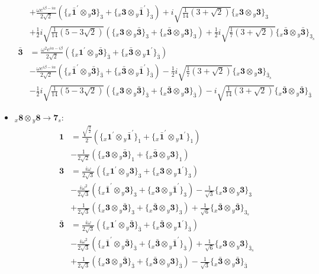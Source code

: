 \documentclass[english]{article}
\newcommand{\rep}[1]{\mathbf{#1}}
\newcommand{\repx}[2]{{}_{#2}\mathbf{#1}}
\newcommand{\tsprodx}[2]{\repx{#1}{x}\otimes\repx{#2}{y}}
\newcommand{\subcgt}[3]{\big\{ \tsprodx{#1}{#2}\big\}^{}_{#3}}
\begin{document}
\begin{itemize}
\begin{align*}
 & +\frac{\omega  e^{i \beta -i \alpha }}{2 \sqrt{2}}\left(\subcgt{\bar{1}^{\prime}}{3}{3}+\subcgt{3}{\bar{1}^{\prime}}{3}\right)+i \sqrt{\frac{1}{14} \left(3+\sqrt{2}\right)}\subcgt{3}{3}{3} \\ 
 & +\frac{1}{2} i \sqrt{\frac{1}{14} \left(5-3 \sqrt{2}\right)}\left(\subcgt{3}{\bar{3}}{3}+\subcgt{\bar{3}}{3}{3}\right)+\frac{1}{2} i \sqrt{\frac{1}{7} \left(3+\sqrt{2}\right)}\subcgt{\bar{3}}{\bar{3}}{3_{s}}
\\
\rep{\bar{3}} & = \frac{\omega ^2 e^{i \alpha -i \beta }}{2 \sqrt{2}}\left(\subcgt{1^{\prime}}{\bar{3}}{\bar{3}}+\subcgt{\bar{3}}{1^{\prime}}{\bar{3}}\right) \\ 
 & -\frac{\omega  e^{i \beta -i \alpha }}{2 \sqrt{2}}\left(\subcgt{\bar{1}^{\prime}}{\bar{3}}{\bar{3}}+\subcgt{\bar{3}}{\bar{1}^{\prime}}{\bar{3}}\right)-\frac{1}{2} i \sqrt{\frac{1}{7} \left(3+\sqrt{2}\right)}\subcgt{3}{3}{\bar{3}_{s}} \\ 
 & -\frac{1}{2} i \sqrt{\frac{1}{14} \left(5-3 \sqrt{2}\right)}\left(\subcgt{3}{\bar{3}}{\bar{3}}+\subcgt{\bar{3}}{3}{\bar{3}}\right)-i \sqrt{\frac{1}{14} \left(3+\sqrt{2}\right)}\subcgt{\bar{3}}{\bar{3}}{\bar{3}}
\end{align*}
\item $\tsprodx{8}{8}\to\rep{7}_{s}$:
\begin{align*}
\rep{1} & = \frac{\sqrt{\frac{3}{2}}}{2}\left(\subcgt{1^{\prime}}{\bar{1}^{\prime}}{1}+\subcgt{\bar{1}^{\prime}}{1^{\prime}}{1}\right) \\ 
 & -\frac{1}{2 \sqrt{2}}\left(\subcgt{3}{\bar{3}}{1}+\subcgt{\bar{3}}{3}{1}\right)
\\
\rep{3} & = \frac{i \omega }{2 \sqrt{3}}\left(\subcgt{1^{\prime}}{3}{3}+\subcgt{3}{1^{\prime}}{3}\right) \\ 
 & -\frac{i \omega ^2}{2 \sqrt{3}}\left(\subcgt{\bar{1}^{\prime}}{3}{3}+\subcgt{3}{\bar{1}^{\prime}}{3}\right)-\frac{1}{\sqrt{3}}\subcgt{3}{3}{3} \\ 
 & +\frac{1}{2 \sqrt{3}}\left(\subcgt{3}{\bar{3}}{3}+\subcgt{\bar{3}}{3}{3}\right)+\frac{1}{\sqrt{6}}\subcgt{\bar{3}}{\bar{3}}{3_{s}}
\\
\rep{\bar{3}} & = \frac{i \omega }{2 \sqrt{3}}\left(\subcgt{1^{\prime}}{\bar{3}}{\bar{3}}+\subcgt{\bar{3}}{1^{\prime}}{\bar{3}}\right) \\ 
 & -\frac{i \omega ^2}{2 \sqrt{3}}\left(\subcgt{\bar{1}^{\prime}}{\bar{3}}{\bar{3}}+\subcgt{\bar{3}}{\bar{1}^{\prime}}{\bar{3}}\right)+\frac{1}{\sqrt{6}}\subcgt{3}{3}{\bar{3}_{s}} \\ 
 & +\frac{1}{2 \sqrt{3}}\left(\subcgt{3}{\bar{3}}{\bar{3}}+\subcgt{\bar{3}}{3}{\bar{3}}\right)-\frac{1}{\sqrt{3}}\subcgt{\bar{3}}{\bar{3}}{\bar{3}}

\end{align*}
\end{itemize}
\end{document}
